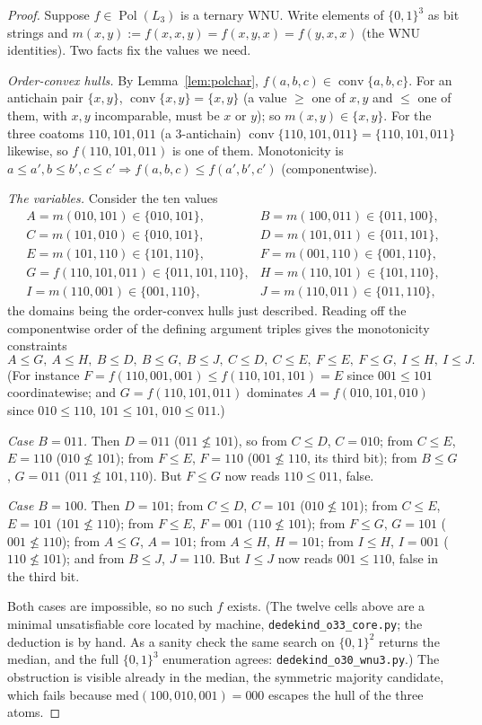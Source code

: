 \documentclass[11pt]{amsart}
\theoremstyle{plain}
\theoremstyle{definition}
\DeclareMathOperator{\conv}{conv}
\DeclareMathOperator{\Pol}{Pol}
\newcommand{\B}{\{0,1\}}
\newcommand{\med}{\mathrm{med}}
\begin{document}
\begin{proof}
  Suppose $f\in\Pol(L_3)$ is a ternary WNU.  Write elements of $\B^3$ as
  bit strings and $m(x,y):=f(x,x,y)=f(x,y,x)=f(y,x,x)$ (the WNU
  identities).  Two facts fix the values we need.

  \emph{Order-convex hulls.}  By Lemma~\ref{lem:polchar},
  $f(a,b,c)\in\conv\{a,b,c\}$.  For an antichain pair $\{x,y\}$,
  $\conv\{x,y\}=\{x,y\}$ (a value $\ge$ one of $x,y$ and $\le$ one of
  them, with $x,y$ incomparable, must be $x$ or $y$); so $m(x,y)\in
  \{x,y\}$.  For the three coatoms $110,101,011$ (a $3$-antichain)
  $\conv\{110,101,011\}=\{110,101,011\}$ likewise, so
  $f(110,101,011)$ is one of them.  Monotonicity is
  $a\le a',b\le b',c\le c'\Rightarrow f(a,b,c)\le f(a',b',c')$
  (componentwise).

  \emph{The variables.}  Consider the ten values
  \[
    \begin{array}{llll}
    A=m(010,101)\in\{010,101\}, & B=m(100,011)\in\{011,100\}, \\
    C=m(101,010)\in\{010,101\}, & D=m(101,011)\in\{011,101\}, \\
    E=m(101,110)\in\{101,110\}, & F=m(001,110)\in\{001,110\}, \\
    G=f(110,101,011)\in\{011,101,110\}, & H=m(110,101)\in\{101,110\}, \\
    I=m(110,001)\in\{001,110\}, & J=m(110,011)\in\{011,110\},
    \end{array}
  \]
  the domains being the order-convex hulls just described.  Reading off
  the componentwise order of the defining argument triples gives the
  monotonicity constraints
  \[
    A\le G,\ A\le H,\ B\le D,\ B\le G,\ B\le J,\ C\le D,\ C\le E,\
    F\le E,\ F\le G,\ I\le H,\ I\le J .
  \]
  (For instance $F=f(110,001,001)\le f(110,101,101)=E$ since
  $001\le101$ coordinatewise; and $G=f(110,101,011)$ dominates
  $A=f(010,101,010)$ since $010\le110$, $101\le101$, $010\le011$.)

  \emph{Case $B=011$.}  Then $D=011$ ($011\not\le101$), so from
  $C\le D$, $C=010$; from $C\le E$, $E=110$ ($010\not\le101$); from
  $F\le E$, $F=110$ ($001\not\le110$, its third bit); from $B\le G$,
  $G=011$ ($011\not\le101,110$).  But $F\le G$ now reads $110\le011$,
  false.

  \emph{Case $B=100$.}  Then $D=101$; from $C\le D$, $C=101$
  ($010\not\le101$); from $C\le E$, $E=101$ ($101\not\le110$); from
  $F\le E$, $F=001$ ($110\not\le101$); from $F\le G$, $G=101$
  ($001\not\le110$); from $A\le G$, $A=101$; from $A\le H$, $H=101$;
  from $I\le H$, $I=001$ ($110\not\le101$); and from $B\le J$, $J=110$.
  But $I\le J$ now reads $001\le110$, false in the third bit.

  Both cases are impossible, so no such $f$ exists.  (The twelve cells
  above are a minimal unsatisfiable core located by machine,
  \texttt{dedekind\_o33\_core.py}; the deduction is by hand.  As a
  sanity check the same search on $\B^2$ returns the median, and the
  full $\B^3$ enumeration agrees: \texttt{dedekind\_o30\_wnu3.py}.)  The
  obstruction is visible already in the median, the symmetric majority
  candidate, which fails because $\med(100,010,001)=000$ escapes the
  hull of the three atoms.
\end{proof}
\end{document}
